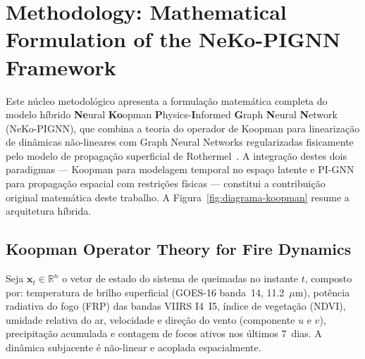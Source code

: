 
\section{Methodology: Mathematical Formulation of the NeKo-PIGNN Framework}
\label{sec:methodology}

Este núcleo metodológico apresenta a formulação matemática completa do modelo híbrido \textbf{Ne}ural \textbf{Ko}opman \textbf{P}hysics-\textbf{I}nformed \textbf{G}raph \textbf{N}eural \textbf{N}etwork (NeKo-PIGNN), que combina a teoria do operador de Koopman para linearização de dinâmicas não-lineares com Graph Neural Networks regularizadas fisicamente pelo modelo de propagação superficial de Rothermel~\cite{article:rothermel1972}. A integração destes dois paradigmas --- Koopman para modelagem temporal no espaço latente e PI-GNN para propagação espacial com restrições físicas --- constitui a contribuição original matemática deste trabalho. A Figura~\ref{fig:diagrama-koopman} resume a arquitetura híbrida.


\subsection{Koopman Operator Theory for Fire Dynamics}
\label{sec:koopman}

Seja $\mathbf{x}_t \in \mathbb{R}^n$ o vetor de estado do sistema de queimadas no instante $t$, composto por: temperatura de brilho superficial (GOES-16 banda~14, 11.2~$\mu$m), potência radiativa do fogo (FRP) das bandas VIIRS I4~I5, índice de vegetação (NDVI), umidade relativa do ar, velocidade e direção do vento (componente $u$ e $v$), precipitação acumulada e contagem de focos ativos nos últimos 7~dias. A dinâmica subjacente é não-linear e acoplada espacialmente.

